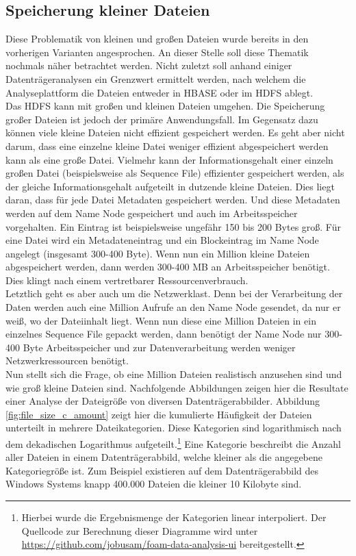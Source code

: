 \subsection{Speicherung kleiner Dateien} 
Diese Problematik von kleinen und großen Dateien wurde bereits in den vorherigen Varianten angesprochen. An dieser Stelle soll diese Thematik nochmals näher betrachtet werden. Nicht zuletzt soll anhand einiger Datenträgeranalysen ein Grenzwert ermittelt werden, nach welchem die Analyseplattform die Dateien entweder in HBASE oder im HDFS ablegt.\\

\noindent
Das HDFS kann mit großen und kleinen Dateien umgehen. Die Speicherung großer Dateien ist jedoch der primäre Anwendungsfall. Im Gegensatz dazu können viele kleine Dateien nicht effizient gespeichert werden. 
Es geht aber nicht darum, dass eine einzelne kleine Datei weniger effizient abgespeichert werden kann als eine große Datei. Vielmehr kann der Informationsgehalt einer einzeln großen Datei (beispielsweise als Sequence File) effizienter gespeichert werden, als der gleiche Informationsgehalt aufgeteilt in dutzende kleine Dateien.
Dies liegt daran, dass für jede Datei Metadaten gespeichert werden. Und diese Metadaten werden auf dem Name Node gespeichert und auch im Arbeitsspeicher vorgehalten.\cite{hdfs_architecture} Ein Eintrag ist beispielsweise ungefähr 150 bis 200 Bytes groß. Für eine Datei wird ein Metadateneintrag und ein Blockeintrag im Name Node angelegt (insgesamt 300-400 Byte). Wenn nun ein Million kleine Dateien abgespeichert werden, dann werden 300-400 MB an Arbeitsspeicher benötigt. 
Dies klingt nach einem vertretbarer Ressourcenverbrauch.\\

\noindent
Letztlich geht es aber auch um die Netzwerklast. Denn bei der Verarbeitung der Daten werden auch eine Million Aufrufe an den Name Node gesendet, da nur er weiß, wo der Dateiinhalt liegt. Wenn nun diese eine Million Dateien in ein einzelnes Sequence File gepackt werden, dann benötigt der Name Node nur 300-400 Byte Arbeitsspeicher und zur Datenverarbeitung werden weniger Netzwerkressourcen benötigt.\\

\noindent
Nun stellt sich die Frage, ob eine Million Dateien realistisch anzusehen sind und wie groß kleine Dateien sind. Nachfolgende Abbildungen zeigen hier die Resultate einer Analyse der Dateigröße von diversen Datenträgerabbilder. Abbildung \ref{fig:file_size_c_amount} zeigt hier die kumulierte Häufigkeit der Dateien unterteilt in mehrere Dateikategorien. Diese Kategorien sind logarithmisch nach dem dekadischen Logarithmus aufgeteilt.\footnote{Hierbei wurde die Ergebnismenge der Kategorien linear interpoliert. Der Quellcode zur Berechnung dieser Diagramme wird unter \url{https://github.com/jobusam/foam-data-analysis-ui} bereitgestellt. } Eine Kategorie beschreibt die Anzahl aller Dateien in einem Datenträgerabbild, welche kleiner als die angegebene Kategoriegröße ist. Zum Beispiel existieren auf dem Datenträgerabbild des Windows Systems knapp 400.000 Dateien die kleiner 10 Kilobyte sind.\\

